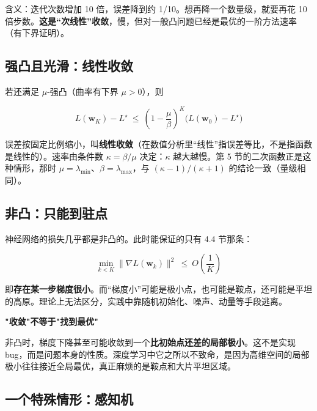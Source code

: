 \documentclass[UTF8, a4paper, zihao=-4, fontset=none]{ctexart}
\begin{document}
含义：迭代次数增加 10 倍，误差降到约 1/10。想再降一个数量级，就要再花 10 倍步数。\textbf{这是“次线性”收敛}，慢，但对一般凸问题已经是最优的一阶方法速率（有下界证明）。




\subsection{强凸且光滑：线性收敛}



若还满足 $\mu$-强凸（曲率有下界 $\mu>0$），则


\[
L(\mathbf{w}_K)-L^\star\ \le\ \left(1-\frac{\mu}{\beta}\right)^{K}\big(L(\mathbf{w}_0)-L^\star\big)
\]


误差按固定比例缩小，叫\textbf{线性收敛}（在数值分析里“线性”指误差等比，不是指函数是线性的）。速率由条件数 $\kappa=\beta/\mu$ 决定：$\kappa$ 越大越慢。第 5 节的二次函数正是这种情形，那时 $\mu=\lambda_{\min}$、$\beta=\lambda_{\max}$，与 $(\kappa-1)/(\kappa+1)$ 的结论一致（量级相同）。




\subsection{非凸：只能到驻点}



神经网络的损失几乎都是非凸的。此时能保证的只有 4.4 节那条：


\[
\min_{k<K}\|\nabla L(\mathbf{w}_k)\|^2\ \le\ O\!\left(\frac{1}{K}\right)
\]


即\textbf{存在某一步梯度很小}。而“梯度小”可能是极小点，也可能是鞍点，还可能是平坦的高原。理论上无法区分，实践中靠随机初始化、噪声、动量等手段逃离。



\begin{warnbox}
{\bfseries\sffamily\small\color{warn} "收敛"不等于"找到最优"}\par\vspace{2pt}
非凸时，梯度下降甚至可能收敛到一个\textbf{比初始点还差的局部极小}。这不是实现 bug，而是问题本身的性质。深度学习中它之所以不致命，是因为高维空间的局部极小往往接近全局最优，真正麻烦的是鞍点和大片平坦区域。


\end{warnbox}




\subsection{一个特殊情形：感知机}
\end{document}

